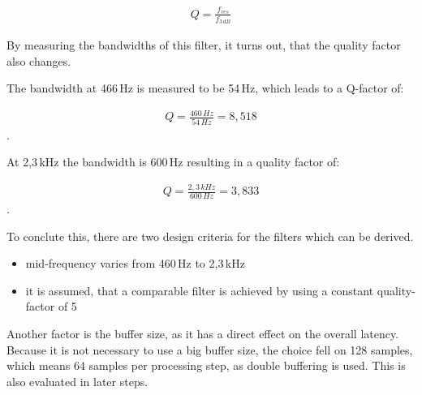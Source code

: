 \begin{align}
    Q = \frac{f_{res}}{f_{3\,dB}}
    \label{eq:q-factor}
\end{align}

By measuring the bandwidths of this filter, it turns out, that the quality factor also changes.

The bandwidth at 466\,Hz is measured to be 54\,Hz, which leads to a Q-factor of:

\begin{align}
    Q = \frac{460\,Hz}{54\,Hz} = 8,518
\end{align}
.

At 2,3\,kHz the bandwidth is 600\,Hz resulting in a quality factor of:

\begin{align}
    Q = \frac{2,3\,kHz}{600\,Hz} = 3,833
\end{align}
.

To conclute this, there are two design criteria for the filters which can be derived.

\begin{itemize}
    \item mid-frequency varies from 460\,Hz to 2,3\,kHz
    \item it is assumed, that a comparable filter is achieved by using a constant quality-factor of 5
\end{itemize}

Another factor is the buffer size, as it has a direct effect on the overall latency.
Because it is not necessary to use a big buffer size, the choice fell on 128 samples, which means
64 samples per processing step, as double buffering is used. This is also evaluated in later steps.
